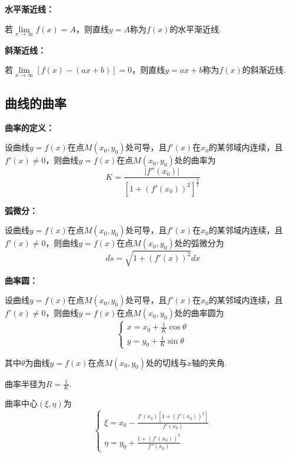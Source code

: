 \documentclass[12pt , a4paper , oneside]{ctexart}
\begin{document}
            \textbf{水平渐近线：}
            \begin{mdframed}
            若$\lim\limits_{x \to \infty} f(x) = A$，则直线$y = A$称为$f(x)$的水平渐近线.
            \end{mdframed}

            \textbf{斜渐近线：}
            \begin{mdframed}
            若$\lim\limits_{x \to \infty} [f(x) - (ax+b)] = 0$，则直线$y = ax+b$称为$f(x)$的斜渐近线.  
            \end{mdframed}

        \subsection{曲线的曲率}
            \textbf{曲率的定义：}
            \begin{mdframed}
            设曲线$y=f(x)$在点$M(x_0,y_0)$处可导，且$f'(x)$在$x_0$的某邻域内连续，且$f'(x) \neq 0$，则曲线$y=f(x)$在点$M(x_0,y_0)$处的曲率为
            $$K = \frac{|f''(x_0)|}{[1+(f'(x_0))^2]^{\frac{3}{2}}}$$
            \end{mdframed}
            
            \textbf{弧微分：}
            \begin{mdframed}
            设曲线$y=f(x)$在点$M(x_0,y_0)$处可导，且$f'(x)$在$x_0$的某邻域内连续，且$f'(x) \neq 0$，则曲线$y=f(x)$在点$M(x_0,y_0)$处的弧微分为
            $$ds = \sqrt{1+(f'(x))^2}dx$$
            \end{mdframed}

            \textbf{曲率圆：}
            \begin{mdframed}
            设曲线$y=f(x)$在点$M(x_0,y_0)$处可导，且$f'(x)$在$x_0$的某邻域内连续，且$f'(x) \neq 0$，则曲线$y=f(x)$在点$M(x_0,y_0)$处的曲率圆为
            $$\begin{cases}
                x = x_0 + \frac{1}{K} \cos \theta\\
                y = y_0 + \frac{1}{K} \sin \theta
            \end{cases}$$

            其中$\theta$为曲线$y=f(x)$在点$M(x_0,y_0)$处的切线与$x$轴的夹角.

            曲率半径为$R = \frac{1}{K}$.

            曲率中心$(\xi,\eta)$为$$\begin{cases}
                \xi = x_0 - \frac{f'(x_0)[1+(f'(x_0))^2]}{f'(x_0)}\\
                \eta = y_0 + \frac{1+(f'(x_0))^2}{f''(x_0)}
            \end{cases}$$

            \end{mdframed}
\end{document}
